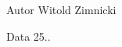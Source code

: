 \begin{DoxyAuthor}{Autor}
Witold Zimnicki 
\end{DoxyAuthor}
\begin{DoxyDate}{Data}
25.. 
\end{DoxyDate}
